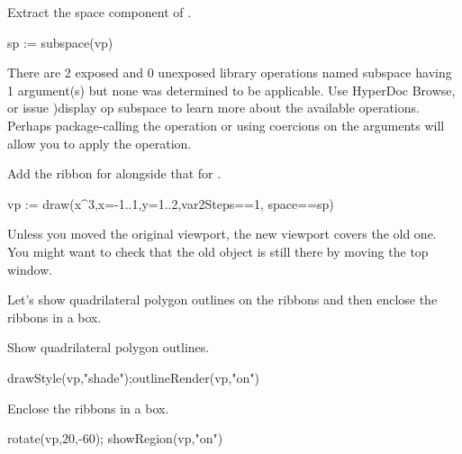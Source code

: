 \begin{xtc}
\begin{xtccomment}
Extract the space component of .
\end{xtccomment}
\begin{spadsrc}
sp := subspace(vp)
\end{spadsrc}
\begin{MessageOutput}
   There are 2 exposed and 0 unexposed library operations named 
      subspace having 1 argument(s) but none was determined to be 
      applicable. Use HyperDoc Browse, or issue
                            )display op subspace
      to learn more about the available operations. Perhaps 
      package-calling the operation or using coercions on the arguments
      will allow you to apply the operation.
\end{MessageOutput}
\end{xtc}

\begin{psXtc}
\begin{xtccomment}
Add the ribbon for
 alongside that for
.
\end{xtccomment}
\begin{spadsrc}
vp := draw(x^3,x=-1..1,y=1..2,var2Steps==1, space==sp)
\end{spadsrc}
\end{psXtc}

Unless you moved the original viewport, the new viewport covers
the old one.
You might want to check that the old object is still there by
moving the top window.

Let's show quadrilateral polygon outlines on the ribbons and then
enclose the ribbons in a box.

\begin{psXtc}
\begin{xtccomment}
Show quadrilateral polygon outlines.
\end{xtccomment}
\begin{spadsrc}
drawStyle(vp,"shade");outlineRender(vp,"on")
\end{spadsrc}
\end{psXtc}
\begin{psXtc}
\begin{xtccomment}
Enclose the ribbons in a box.
\end{xtccomment}
\begin{spadsrc}
rotate(vp,20,-60); showRegion(vp,"on")
\end{spadsrc}
\end{psXtc}


